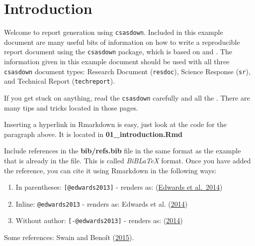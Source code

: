 \documentclass[12pt]{article}\usepackage[]{graphicx}\usepackage[]{color}
\begin{document}

\frontmatter


\renewcommand{\headrulewidth}{0.5pt}  %
\renewcommand{\footrulewidth}{0.5pt}  %

\newcommand{\lt}{\ensuremath <}
\newcommand{\gt}{\ensuremath >}

% 
\hypertarget{sec:introduction}{%
\section{Introduction}\label{sec:introduction}}

Welcome to report generation using \texttt{csasdown}. Included in this example document are many useful bits of information on how to write a reproducible report document using the \texttt{csasdown} package, which is based on  and . The information given in this example document should be used with all three \texttt{csasdown} document types: Research Document (\texttt{resdoc}), Science Response (\texttt{sr}), and Technical Report (\texttt{techreport}).

If you get stuck on anything, read the \texttt{csasdown}  carefully and all the . There are many tips and tricks located in those pages.

Inserting a hyperlink in Rmarkdown is easy, just look at the code for the paragraph above. It is located in \textbf{01\_introduction.Rmd}

Include references in the \textbf{bib/refs.bib} file in the same format as the example that is already in the file. This is called \emph{BiBLaTeX} format. Once you have added the reference, you can cite it using Rmarkdown in the following ways:
\begin{enumerate}
\def\labelenumi{\arabic{enumi}.}

\item
  In parentheses: \texttt{{[}@edwards2013{]}} - renders as: (\protect\hyperlink{ref-edwards2013}{Edwards et al.~2014})
\item
  Inline: \texttt{@edwards2013} - renders as: Edwards et al. (\protect\hyperlink{ref-edwards2013}{2014})
\item
  Without author: \texttt{{[}-@edwards2013{]}} - renders as: (\protect\hyperlink{ref-edwards2013}{2014})
\end{enumerate}
Some references: Swain and Benoît (\protect\hyperlink{ref-swainbenoit2015}{2015}).
\end{document}
